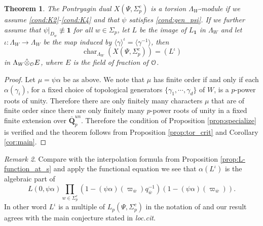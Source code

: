 \documentclass[leqno]{amsart}
\newtheorem{thm}{Theorem}[section]
\theoremstyle{definition}
\theoremstyle{remark}
\newtheorem{rem}[thm]{Remark}
\newcommand{\id}{\mathbf{1}}
\newcommand{\eo}{\EuScript{O}}
\newcommand{\Q}{{\mathbf{Q}}}
\newcommand{\bw}{{\overline{w}}}
\DeclareMathOperator{\car}{char}
\begin{document}
\begin{thm}

The Pontryagin dual
$X(\Psi,\Sigma_p^c)$ is a torsion $\Lambda_W$-module if 
we assume \ref{cond:K2}-\ref{cond:K4} and
that $\psi$ satisfies \eqref{cond:gen_psi}.
If we further assume that
$\psi\vert_{D_w}\not\equiv\id$  for all $w\in\Sigma_p$,
let $L$ be the image of $L_\id$ in $\Lambda_W$
and let $\iota\colon \Lambda_W\to\Lambda_W$
be the map induced by 
$\langle\gamma\rangle^\iota=\langle\gamma^{-1}\rangle$, then
\[
\car_{\Lambda_W}(X(\Psi,\Sigma_p^c))=(L^\iota)
\]
in $\Lambda_W\hat{\otimes}_\eo E$,
where $E$ is the field of fraction of $\eo$.
\end{thm}
\begin{proof}

Let $\mu=\psi\alpha$ be as above.
We note that $\mu$ has finite order if and only if 
each $\alpha(\gamma_i)$,
for a fixed choice of topological generators
$\{\gamma_1,\cdots,\gamma_d\}$ of $W$,
is a $p$-power roots of unity.
Therefore there are only finitely many characters $\mu$
that are of finite order 
since there are only finitely many 
$p$-power roots of unity in a fixed 
finite extension over $\bar{\Q}_p^{un}$.
Therefore the condition of Proposition \ref{prop:specialize}
is verified and the theorem follows from 
Proposition \ref{prop:tor_crit} and
Corollary \ref{cor:main}.


\end{proof}

\begin{rem}
Compare with the interpolation formula 
from Proposition \ref{prop:L-function_at_s}
and apply the functional equation we see that
$\alpha(L^\iota)$ is the algebraic part of 
\[
L(0,\psi\alpha)\prod_{w\in\Sigma_p^c}
(1-(\psi\alpha)(\varpi_\bw)q_\bw^{-1})
(1-(\psi\alpha)(\varpi_\bw)).
\]
In other word $L^\iota$ is a multiple
of $L_p(\Psi,\Sigma_p^c)$ in the notation
of \cite{Hsieh2010}
and our result agrees with the main conjecture
stated in \textit{loc.cit}.
\end{rem}








\newpage
\end{document}
